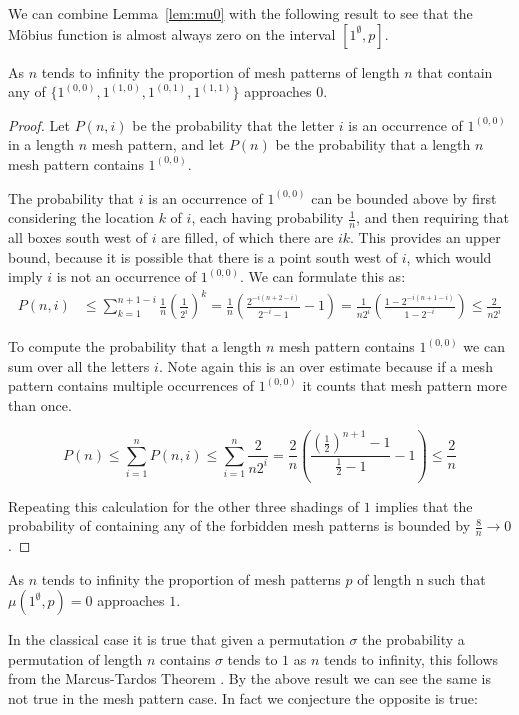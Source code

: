 \documentclass[11pt,a4paper,oneside]{article}
\begin{document}
We can combine Lemma~\ref{lem:mu0} with the following result to see that the
M\"obius function is almost always zero on the interval $[1^\emptyset,p]$.

\begin{lem}
As $n$ tends to infinity the proportion of mesh patterns of length $n$ that contain any of
$\{1^{(0,0)},1^{(1,0)},1^{(0,1)},1^{(1,1)}\}$ approaches $0$.
\begin{proof}
Let $P(n,i)$ be the probability that the letter $i$ is an occurrence of
$1^{(0,0)}$ in a length $n$ mesh pattern, and let $P(n)$ be the probability
that a length $n$ mesh pattern contains $1^{(0,0)}$.

The probability that $i$ is an occurrence of $1^{(0,0)}$ can be bounded
above by first considering the location $k$ of $i$, each having probability
$\frac{1}{n}$, and then requiring
that all boxes south west of $i$ are filled, of which there are $ik$. This
provides an upper bound, because it is possible that there is a
point south west of $i$, which would imply $i$ is not an occurrence of
$1^{(0,0)}$. We can formulate this as:
\begin{align*}
P(n,i)&\le\sum_{k=1}^{n+1-i}\frac{1}{n}\left(\frac{1}{2^i}\right)^k
=\frac{1}{n}\left(\frac{2^{-i(n+2-i)}}{2^{-i}-1}-1\right)
=\frac{1}{n2^i}\left(\frac{1-2^{-i(n+1-i)}}{1-2^{-i}}\right)
\le\frac{2}{n2^i}
\end{align*}

To compute the probability that a length $n$ mesh pattern contains $1^{(0,0)}$ we
can sum over all the letters $i$.
Note again this is an over estimate because if a mesh pattern contains multiple
occurrences of $1^{(0,0)}$ it counts that mesh pattern more than once.

$$
P(n)\le\sum_{i=1}^{n}P(n,i)\le\sum_{i=1}^{n}\frac{2}{n2^i}
=\frac{2}{n}\left(\frac{\left(\frac{1}{2}\right)^{n+1}-1}{\frac{1}{2}-1}-1\right)
\le\frac{2}{n}
$$

Repeating this calculation for the other three shadings of $1$ implies that
the probability of containing any of the forbidden mesh patterns is bounded
by $\frac{8}{n}\rightarrow 0$.
\end{proof}
\end{lem}

\begin{cor}
As $n$ tends to infinity the proportion of mesh patterns $p$ of length n such
that $\mu(1^\emptyset,p)=0$ approaches $1$.
\end{cor}


In the classical case it is true that given a permutation $\sigma$ the
probability a permutation of length $n$ contains $\sigma$ tends to $1$ as $n$
tends to infinity, this follows from the Marcus-Tardos Theorem \cite{MT04}. By
the above result we can see the same is not true in the mesh pattern case. In
fact we conjecture the opposite is true:
\end{document}
